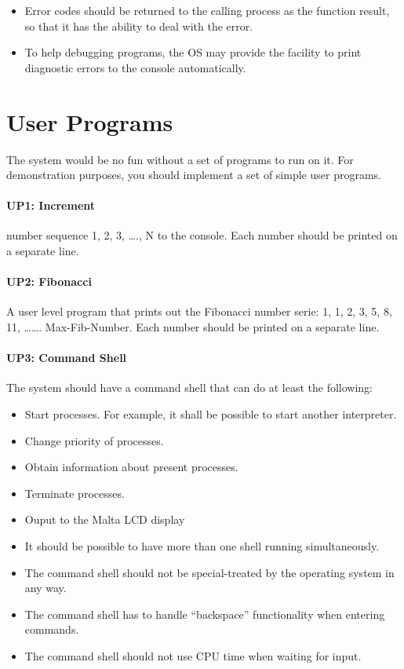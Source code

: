 \begin{itemize}
  \item Error codes should be returned to the calling process as the function result, so that it has the ability to deal with the error.
  \item  To help debugging programs, the OS may provide the facility to print diagnostic errors to the console automatically.
\end{itemize}

\section{User Programs}

The system would be no fun without a set of programs to run on it. For demonstration purposes, you should implement a set of simple user programs.

\paragraph{UP1: Increment}
number sequence 1, 2, 3, \ldots., N to the console. Each number should be printed on a separate line.

\paragraph{UP2: Fibonacci}

A user level program that prints out the Fibonacci number serie: 1, 1, 2, 3, 5, 8, 11, \ldots\ldots. Max-Fib-Number. Each number should be printed on a separate line.

\paragraph{UP3: Command Shell}

The system should have a command shell that can do at least the following:

\begin{itemize}
  \item Start processes. For example, it shall be possible to start another interpreter.
  \item  Change priority of processes.
  \item  Obtain information about present processes.
  \item  Terminate processes.
  \item  Ouput to the Malta LCD display
  \item  It should be possible to have more than one shell running simultaneously.
  \item  The command shell should not be special-treated by the operating system in any way.
  \item  The command shell has to handle ``backspace'' functionality when entering commands.
  \item  The command shell should not use CPU time when waiting for input.
\end{itemize}

